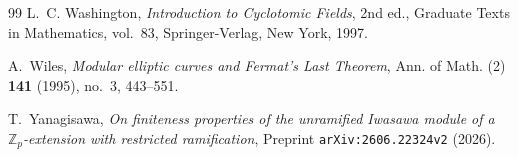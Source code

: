\documentclass[11pt,reqno]{amsart}
\theoremstyle{remark}
\numberwithin{equation}{section}
\newcommand{\Z}{\mathbb{Z}}
\begin{document}
\begin{thebibliography}{99}
L.~C. Washington, \emph{Introduction to Cyclotomic Fields}, 2nd ed., Graduate Texts in Mathematics, vol.~83, Springer-Verlag, New York, 1997.

A.~Wiles, \emph{Modular elliptic curves and Fermat's Last Theorem}, Ann. of Math. (2) \textbf{141} (1995), no.~3, 443--551.

T.~Yanagisawa, \emph{On finiteness properties of the unramified Iwasawa module of a $\Z_p$-extension with restricted ramification}, Preprint \texttt{arXiv:2606.22324v2} (2026).

\end{thebibliography}
\end{document}
